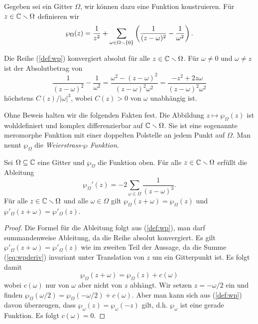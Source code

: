 Gegeben sei ein Gitter $\Omega$, wir können dazu eine Funktion
konstruieren. Für $z\in {\mathbb{C}}\smallsetminus\Omega$ definieren wir
\begin{equation}
  \label{def:wp}
  \wp_\Omega(z) = \frac{1}{z^2} + \sum_{\omega\in \Omega\smallsetminus\{0\}}
  \left(\frac{1}{(z-\omega)^2} - \frac{1}{\omega^2}\right).
\end{equation}

\begin{bemerkung}
  Die Reihe (\ref{def:wp}) konvergiert absolut für alle
  $z\in{\mathbb{C}}\smallsetminus\Omega$.
  Für $\omega\not=0$ und
  $\omega\not=z$ ist der
  Absolutbetrag von 
  \begin{equation*}
    \frac{1}{(z-\omega)^2} - \frac{1}{\omega^2} =
    \frac{\omega^2 - (z-\omega)^2}{(z-\omega)^2\omega^2}
    =\frac{-z^2 + 2z\omega}{(z-\omega)^2\omega^2}
  \end{equation*}
  höchstens $C(z)/|\omega|^3$, wobei $C(z)>0$ von $\omega$ unabhängig
  ist. 
\end{bemerkung}

Ohne Beweis halten wir die folgenden Fakten fest.
Die Abbildung $z\mapsto \wp_\Omega(z)$ ist wohldefiniert und komplex
differenzierbar auf ${\mathbb{C}}\smallsetminus\Omega$. Sie ist eine sogenannte meromorphe Funktion
mit einer doppelten Polstelle an jedem Punkt auf $\Omega$. 
Man nennt $\wp_\Omega$ die \emph{Weierstrass-$\wp$
  Funktion}.

\begin{lemma}
  Sei $\Omega \subseteq{\mathbb{C}}$ eine Gitter und $\wp_\Omega$ die Funktion
  oben. Für alle $z\in{\mathbb{C}}\smallsetminus\Omega$ erfüllt die Ableitung
  \begin{equation}
    \label{eq:wpderiv}
    \wp_\Omega'(z) = -2 \sum_{\omega\in\Omega} \frac{1}{(z-\omega)^3}.
  \end{equation}
  Für alle $z\in{\mathbb{C}}\smallsetminus\Omega$ und alle  $\omega\in\Omega$
  gilt $\wp_\Omega(z+\omega) = \wp_\Omega(z)$ und
  $\wp'_\Omega(z+\omega) = \wp'_\Omega(z)$.
\end{lemma}
\begin{proof}
  Die Formel für die Ableitung folgt aus (\ref{def:wp}), man darf
  summandenweise Ableitung, da die Reihe absolut konvergiert. Es gilt
  $\wp'_\Omega(z+\omega) = \wp'_\Omega(z)$ wie im zweiten Teil der
  Aussage, da die Summe (\ref{eq:wpderiv}) invariant unter Translation
  von $z$ um ein Gitterpunkt ist.
  Es folgt damit
  $$
  \wp_\Omega(z+\omega) = \wp_\Omega(z) + c(\omega)
  $$
  wobei $c(\omega)$ nur von $\omega$ aber nicht von $z$ abhängt.
  Wir setzen $z=-\omega/2$ ein und finden
  $\wp_\Omega(\omega/2) = \wp_\Omega(-\omega/2) + c(\omega)$.
  Aber man kann sich aus (\ref{def:wp}) davon überzeugen, dass
  $\wp_\omega(z)=\wp_\omega(-z)$ gilt, d.h. $\wp_\omega$ ist eine
  gerade Funktion. Es folgt $c(\omega)=0$. 
\end{proof}

